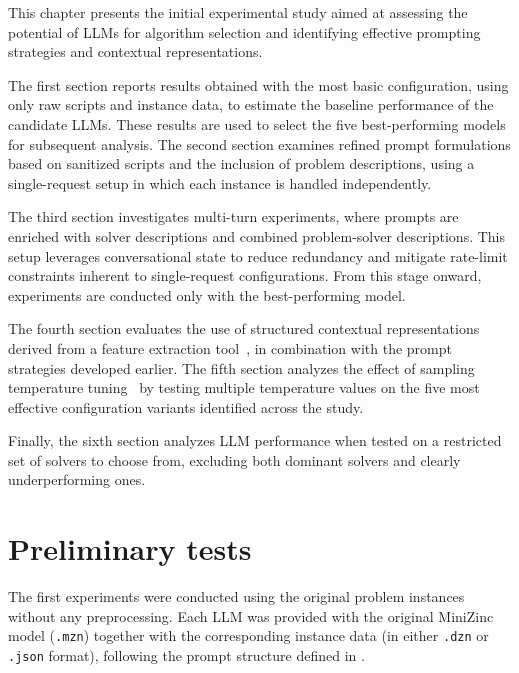 \documentclass[../../main]{subfiles}
\begin{document}
This chapter presents the initial experimental study aimed at assessing the potential of LLMs for algorithm selection and identifying effective prompting strategies and contextual representations.

The first section reports results obtained with the most basic configuration, using only raw scripts and instance data, to estimate the baseline performance of the candidate LLMs. These results are used to select the five best-performing models for subsequent analysis. The second section examines refined prompt formulations based on sanitized scripts and the inclusion of problem descriptions, using a single-request setup in which each instance is handled independently.

The third section investigates multi-turn experiments, where prompts are enriched with solver descriptions and combined problem-solver descriptions. This setup leverages conversational state to reduce redundancy and mitigate rate-limit constraints inherent to single-request configurations. From this stage onward, experiments are conducted only with the best-performing model.

The fourth section evaluates the use of structured contextual representations derived from a feature extraction tool~\cite{mzn2feat}, in combination with the prompt strategies developed earlier. The fifth section analyzes the effect of sampling temperature tuning~\cite{ContextualTemp} by testing multiple temperature values on the five most effective configuration variants identified across the study.

Finally, the sixth section analyzes LLM performance when tested on a restricted set of solvers to choose from, excluding both dominant solvers and clearly underperforming ones.

\section{Preliminary tests}
\label{sec:initTests}
The first experiments were conducted using the original problem instances without any preprocessing. Each LLM was provided with the original MiniZinc model (\texttt{.mzn}) together with the corresponding instance data (in either \texttt{.dzn} or \texttt{.json} format), following the prompt structure defined in .
\end{document}
